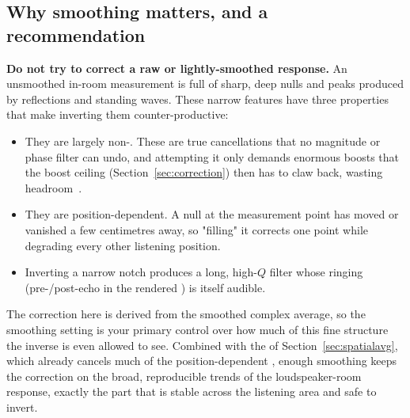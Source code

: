 \subsection{Why smoothing matters, and a recommendation}\label{sec:smoothrec}
\textbf{Do not try to correct a raw or lightly-smoothed response.} An unsmoothed in-room measurement is full of sharp, deep nulls and peaks produced by reflections and standing waves. These narrow features have three properties that make inverting them counter-productive:
\begin{itemize}[nosep]
  \item They are largely non-. These are true cancellations that no magnitude or phase filter can undo, and attempting it only demands enormous boosts that the boost ceiling (Section~\ref{sec:correction}) then has to claw back, wasting headroom~\cite{NeelyAllen,Mourjopoulos1994}.
  \item They are position-dependent. A null at the measurement point has moved or vanished a few centimetres away, so "filling" it corrects one point while degrading every other listening position.
  \item Inverting a narrow notch produces a long, high-$Q$ filter whose ringing (pre-/post-echo in the rendered ) is itself audible.
\end{itemize}
The correction here is derived from the smoothed complex average, so the smoothing setting is your primary control over how much of this fine structure the inverse is even allowed to see. Combined with the  of Section~\ref{sec:spatialavg}, which already cancels much of the position-dependent , enough smoothing keeps the correction on the broad, reproducible trends of the loudspeaker-room response, exactly the part that is stable across the listening area and safe to invert.

